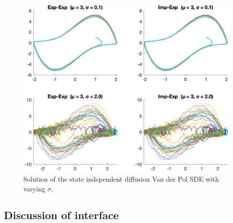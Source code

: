 \begin{figure}[H]
    \centering
    \includegraphics[width=\textwidth]{plots/4b.eps}
    \caption{Solution of the state independent diffusion Van der Pol SDE with varying $\sigma$.}
    \label{fig:4b}
\end{figure}




\subsection{Discussion of interface}